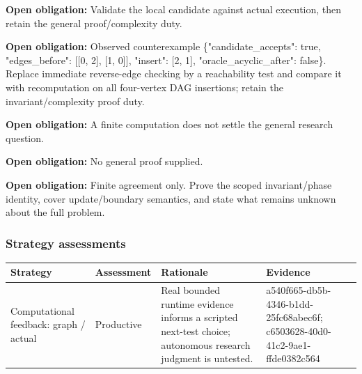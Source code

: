\documentclass[11pt]{article}
\begin{document}
\textbf{Open obligation:} Validate the local candidate against actual execution, then retain the general proof/complexity duty.\par
\textbf{Open obligation:} Observed counterexample \{"candidate\_accepts": true, "edges\_before": [[0, 2], [1, 0]], "insert": [2, 1], "oracle\_acyclic\_after": false\}. Replace immediate reverse-edge checking by a reachability test and compare it with recomputation on all four-vertex DAG insertions; retain the invariant/complexity proof duty.\par
\textbf{Open obligation:} A finite computation does not settle the general research question.\par
\textbf{Open obligation:} No general proof supplied.\par
\textbf{Open obligation:} Finite agreement only. Prove the scoped invariant/phase identity, cover update/boundary semantics, and state what remains unknown about the full problem.\par
\subsubsection*{Strategy assessments}
\begin{longtable}{>{\raggedright\arraybackslash}p{.16\linewidth}>{\raggedright\arraybackslash}p{.15\linewidth}>{\raggedright\arraybackslash}p{.40\linewidth}>{\raggedright\arraybackslash}p{.17\linewidth}}
\toprule Strategy & Assessment & Rationale & Evidence \\
\midrule\endhead
Computational feedback: graph / actual & Productive & Real bounded runtime evidence informs a scripted next-test choice; autonomous research judgment is untested. & a540f665-db5b-4346-b1dd-25fc68abec6f; c6503628-40d0-41c2-9ae1-ffde0382c564 \\
\bottomrule
\end{longtable}
\end{document}

